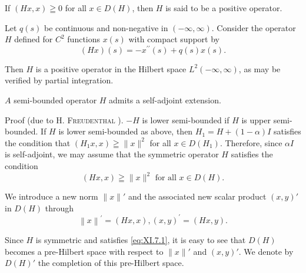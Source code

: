If $(H x, x) \geqq 0$ for all $x \in D(H)$, then $H$ is said to be a positive operator. 

\begin{examplen} Let $q(s)$ be continuous and non-negative in $(-\infty, \infty)$. Consider the operator $H$ defined for $C^{2}$ functions $x(s)$ with compact support by
\[
(H x) (s) = - x ^{\prime \prime} (s) + q (s) x (s).
\]

Then $H$ is a positive operator in the Hilbert space $L^{2}(-\infty,\infty)$, as may be verified by partial integration. 

\end{examplen}
\begin{theorem}\label{thm:XI.7.Theorem.2} $A$ semi-bounded operator $H$ admits a self-adjoint extension. 
\end{theorem}

Proof (due to H. \textsc{Freudenthal} \cite{freudenthal66}). $-H$ is lower semi-bounded if $H$ is upper semi-bounded. If $H$ is lower semi-bounded as above, then $H_{1} = H + (1 - \alpha)I$ satisfies the condition that $(H_{1}x, x) \geqq \|x\|^{2}$ for all $x \in D(H_{1})$. Therefore, since $\alpha I$ is self-adjoint, we may assume that the symmetric operator $H$ satisfies the condition 
\begin{equation}\label{eq:XI.7.1}
(H x, x) \geqq \| x \| ^{2} \text{ for all } x \in D (H).
\end{equation}

We introduce a new norm $\|x\|'$ and the associated new scalar product $(x, y)'$ in $D(H)$ through 
\begin{equation}\label{eq:XI.7.2}
\left\| x \right\| ^{\prime} = (H x, x), (x, y) ^{\prime} = (H x, y).
\end{equation}

Since $H$ is symmetric and satisfies \eqref{eq:XI.7.1}, it is easy to see that $D(H)$ becomes a pre-Hilbert space with respect to $\|x\|'$ and $(x, y)'$. We denote by $D(H)'$ the completion of this pre-Hilbert space. 

